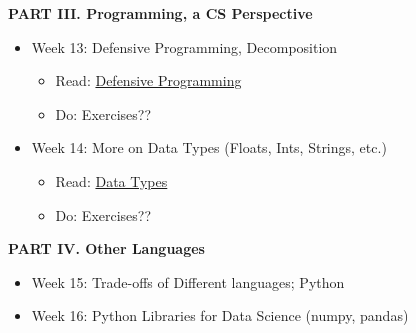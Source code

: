 \documentclass[12pt]{article}
\begin{document}
\vspace{.4in}
\begin{center}
	\textbf{PART III. Programming, a CS Perspective}
\end{center}
\vspace{.2in}

\begin{itemize}
	\item Week 13: Defensive Programming, Decomposition
		\begin{itemize}
			\item Read: \href{http://www.programming4ds.com/html/defensive_programming.html}{Defensive Programming}
			\item Do: Exercises??
		\end{itemize}


	\item Week 14: More on Data Types (Floats, Ints, Strings, etc.)
	\begin{itemize}
		\item Read: \href{http://www.programming4ds.com/html/data_types.html}{Data Types}
		\item Do: Exercises??
	\end{itemize}

\end{itemize}

\vspace{.4in}
\begin{center}
	\textbf{PART IV. Other Languages}
\end{center}
\vspace{.2in}

\begin{itemize}
	\item Week 15: Trade-offs of Different languages; Python
	\item Week 16: Python Libraries for Data Science (numpy, pandas)
\end{itemize}
\end{document}
